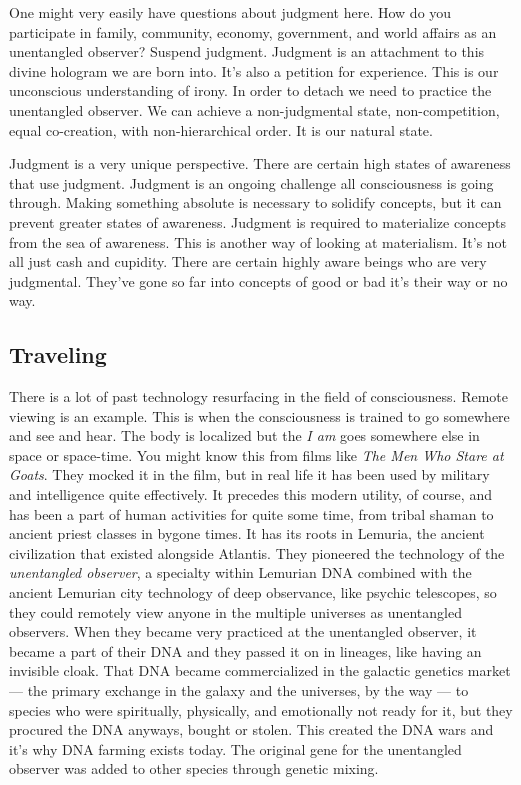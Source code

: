 One might very easily have questions about judgment here. How do you
participate in family, community, economy, government, and world affairs
as an unentangled observer? Suspend judgment. Judgment is an attachment
to this divine hologram we are born into. It's also a petition for
experience. This is our unconscious understanding of irony. In order to
detach we need to practice the unentangled observer. We can achieve a
non-judgmental state, non-competition, equal co-creation, with
non-hierarchical order. It is our natural state.

Judgment is a very unique perspective. There are certain high states of
awareness that use judgment. Judgment is an ongoing challenge all
consciousness is going through. Making something absolute is necessary
to solidify concepts, but it can prevent greater states of awareness.
Judgment is required to materialize concepts from the sea of awareness.
This is another way of looking at materialism. It's not all just cash
and cupidity. There are certain highly aware beings who are very
judgmental. They've gone so far into concepts of good or bad it's their
way or no way.

\subsection*{Traveling}\label{traveling}

There is a lot of past technology resurfacing in the field of
consciousness. Remote viewing is an example. This is when the
consciousness is trained to go somewhere and see and hear. The body is
localized but the \emph{I am} goes somewhere else in space or
space-time. You might know this from films like \emph{The Men Who Stare
at Goats}. They mocked it in the film, but in real life it has been used
by military and intelligence quite effectively. It precedes this modern
utility, of course, and has been a part of human activities for quite
some time, from tribal shaman to ancient priest classes in bygone times.
It has its roots in Lemuria, the ancient civilization that existed
alongside Atlantis. They pioneered the technology of the
\emph{unentangled observer}, a specialty within Lemurian DNA combined
with the ancient Lemurian city technology of deep observance, like
psychic telescopes, so they could remotely view anyone in the multiple
universes as unentangled observers. When they became very practiced at
the unentangled observer, it became a part of their DNA and they passed
it on in lineages, like having an invisible cloak. That DNA became
commercialized in the galactic genetics market --- the primary exchange
in the galaxy and the universes, by the way --- to species who were
spiritually, physically, and emotionally not ready for it, but they
procured the DNA anyways, bought or stolen. This created the DNA wars
and it's why DNA farming exists today. The original gene for the
unentangled observer was added to other species through genetic mixing.

